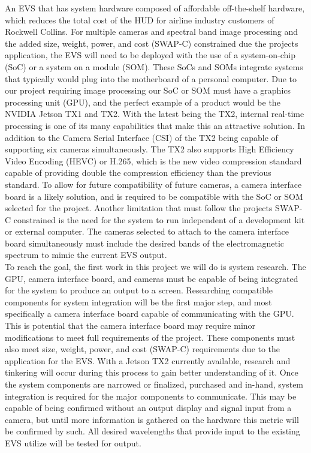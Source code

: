 \documentclass[letterpaper,10pt,serif,draftclsnofoot,onecolumn,compsoc,titlepage]{IEEEtran}
\begin{document}
An EVS that has system hardware composed of affordable off-the-shelf hardware, which 
reduces the total cost of the HUD for airline industry customers of Rockwell Collins. 
For multiple cameras and spectral band image processing and the added size, weight, 
power, and cost (SWAP-C) constrained due the projects application, the EVS will need 
to be deployed with the use of a system-on-chip (SoC) or a system on a module (SOM). 
These SoCs and SOMs integrate systems that typically would plug into the motherboard 
of a personal computer. Due to our project requiring image processing our SoC or SOM 
must have a graphics processing unit (GPU), and the perfect example of a product would 
be the NVIDIA Jetson TX1 and TX2. With the latest being the TX2, internal real-time 
processing is one of its many capabilities that make this an attractive solution. In 
addition to the Camera Serial Interface (CSI) of the TX2 being capable of supporting 
six cameras simultaneously. The TX2 also supports High Efficiency Video Encoding 
(HEVC) or H.265, which is the new video compression standard capable of providing 
double the compression efficiency than the previous standard. To allow for future 
compatibility of future cameras, a camera interface board is a likely solution, and 
is required to be compatible with the SoC or SOM selected for the project. Another 
limitation that must follow the projects SWAP-C constrained is the need for the system 
to run independent of a development kit or external computer. The cameras selected 
to attach to the camera interface board simultaneously must include the desired bands 
of the electromagnetic spectrum to mimic the current EVS output. \\

To reach the goal, the first work in this project we will do is system research. The 
GPU, camera interface board, and cameras must be capable of being integrated for the 
system to produce an output to a screen. Researching compatible components for system 
integration will be the first major step, and most specifically a camera interface 
board capable of communicating with the GPU. This is potential that the camera 
interface board may require minor modifications to meet full requirements of the 
project. These components must also meet size, weight, power, and cost (SWAP-C) 
requirements due to the application for the EVS. With a Jetson TX2 currently 
available, research and tinkering will occur during this process to gain better 
understanding of it. Once the system components are narrowed or finalized, purchased 
and in-hand, system integration is required for the major components to communicate. 
This may be capable of being confirmed without an output display and signal input from 
a camera, but until more information is gathered on the hardware this metric will be 
confirmed by such. All desired wavelengths that provide input to the existing EVS 
utilize will be tested for output. \\
\end{document}
